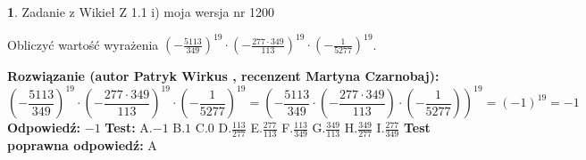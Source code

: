\documentclass[12pt, a4paper]{article}
\theoremstyle{definition} %
\newtheorem{zad}{}
\newcommand{\zadStart}[1]{\begin{zad}#1\newline}
\newcommand{\zadStop}{\end{zad}}
\newcommand{\rozwStart}[2]{\noindent \textbf{Rozwiązanie (autor #1 , recenzent #2): }\newline}
\newcommand{\rozwStop}{\newline}
\newcommand{\odpStart}{\noindent \textbf{Odpowiedź:}\newline}
\newcommand{\odpStop}{\newline}
\newcommand{\testStart}{\noindent \textbf{Test:}\newline}
\newcommand{\testStop}{\newline}
\newcommand{\kluczStart}{\noindent \textbf{Test poprawna odpowiedź:}\newline}
\newcommand{\kluczStop}{\newline}
\begin{document}
\zadStart{Zadanie z Wikieł Z 1.1 i) moja wersja nr 1200}

Obliczyć wartość wyrażenia $(-\frac{5113}{349})^{19} \cdot (-\frac{277 \cdot 349}{113})^{19} \cdot (-\frac{1}{5277})^{19}$.
\zadStop
\rozwStart{Patryk Wirkus}{Martyna Czarnobaj}
$$(-\frac{5113}{349})^{19} \cdot (-\frac{277 \cdot 349}{113})^{19} \cdot (-\frac{1}{5277})^{19} = (-\frac{5113}{349} \cdot (-\frac{277 \cdot 349}{113}) \cdot (-\frac{1}{5277}))^{19} = (-1)^{19} = -1$$
\rozwStop
\odpStart
$-1$
\odpStop
\testStart
A.$-1$ B.$1$ C.$0$ D.$\frac{113}{277}$ E.$\frac{277}{113}$
F.$\frac{113}{349}$ G.$\frac{349}{113}$
H.$\frac{349}{277}$
I.$\frac{277}{349}$
\testStop
\kluczStart
A
\kluczStop
\end{document}
